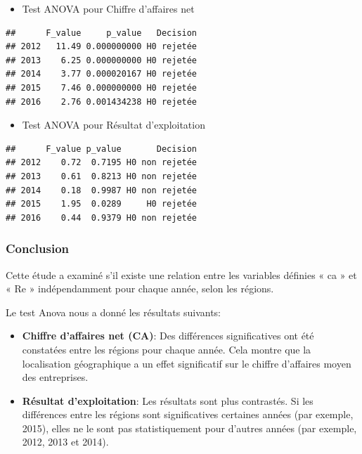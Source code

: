 \documentclass[mstat,12pt]{unswthesis}
\begin{document}
\medskip

\begin{itemize}
\tightlist
\item
  Test ANOVA pour Chiffre d'affaires net
\end{itemize}

\medskip

\begin{verbatim}
##      F_value     p_value   Decision
## 2012   11.49 0.000000000 H0 rejetée
## 2013    6.25 0.000000000 H0 rejetée
## 2014    3.77 0.000020167 H0 rejetée
## 2015    7.46 0.000000000 H0 rejetée
## 2016    2.76 0.001434238 H0 rejetée
\end{verbatim}

\bigskip

\begin{itemize}
\tightlist
\item
  Test ANOVA pour Résultat d'exploitation \medskip
\end{itemize}

\begin{verbatim}
##      F_value p_value       Decision
## 2012    0.72  0.7195 H0 non rejetée
## 2013    0.61  0.8213 H0 non rejetée
## 2014    0.18  0.9987 H0 non rejetée
## 2015    1.95  0.0289     H0 rejetée
## 2016    0.44  0.9379 H0 non rejetée
\end{verbatim}

\subsubsection{Conclusion}\label{conclusion-1}

Cette étude a examiné s'il existe une relation entre les variables
définies « ca » et « Re » indépendamment pour chaque année, selon les
régions.

Le test Anova nous a donné les résultats suivants:

\begin{itemize}
\tightlist
\item
  \textbf{Chiffre d'affaires net (CA)}: Des différences significatives
  ont été constatées entre les régions pour chaque année. Cela montre
  que la localisation géographique a un effet significatif sur le
  chiffre d'affaires moyen des entreprises.
\end{itemize}

\medskip

\begin{itemize}
\tightlist
\item
  \textbf{Résultat d'exploitation}: Les résultats sont plus contrastés.
  Si les différences entre les régions sont significatives certaines
  années (par exemple, 2015), elles ne le sont pas statistiquement pour
  d'autres années (par exemple, 2012, 2013 et 2014).
\end{itemize}
\end{document}
